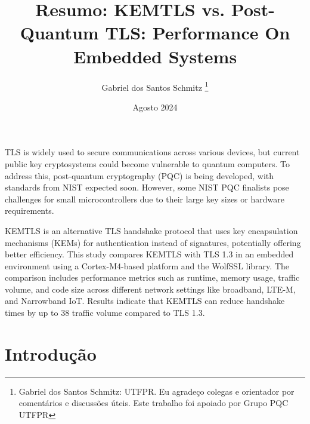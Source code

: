 \documentclass[letterpaper,11pt,leqno]{article}
\begin{document}
\title{Resumo: KEMTLS vs. Post-Quantum TLS: Performance On Embedded Systems}

\author{Gabriel dos Santos Schmitz
	\thanks{Gabriel dos Santos Schmitz: UTFPR. Eu agradeço colegas e orientador
		por comentários e discussões úteis. Este trabalho foi apoiado por Grupo PQC
		UTFPR}}

\date{Agosto 2024}


\begin{titlepage}

	\maketitle

	TLS is widely used to secure communications across various devices, but
	current public key cryptosystems could become vulnerable to quantum computers.
	To address this, post-quantum cryptography (PQC) is being developed, with
	standards from NIST expected soon. However, some NIST PQC finalists pose
	challenges for small microcontrollers due to their large key sizes or hardware
	requirements.

	KEMTLS is an alternative TLS handshake protocol that uses key encapsulation
	mechanisms (KEMs) for authentication instead of signatures, potentially
	offering better efficiency. This study compares KEMTLS with TLS 1.3 in an
	embedded environment using a Cortex-M4-based platform and the WolfSSL library.
	The comparison includes performance metrics such as runtime, memory usage,
	traffic volume, and code size across different network settings like
	broadband, LTE-M, and Narrowband IoT. Results indicate that KEMTLS can reduce
	handshake times by up to 38%
	traffic volume compared to TLS 1.3.

\end{titlepage}

\section{Introdução}
\end{document}
